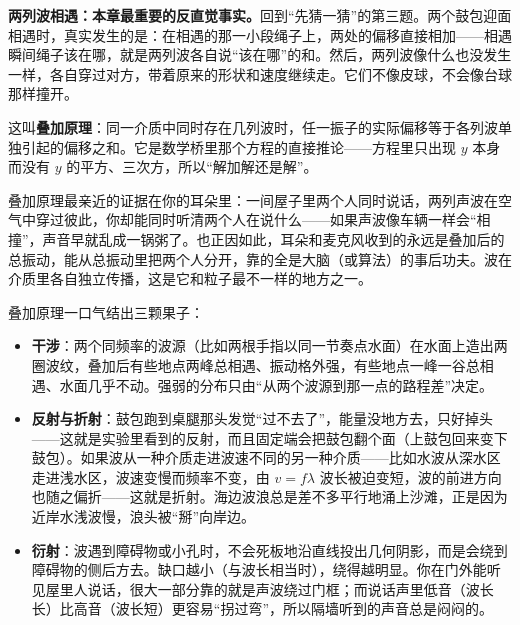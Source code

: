 \begin{mainline}
\textbf{两列波相遇：本章最重要的反直觉事实。}回到“先猜一猜”的第三题。两个鼓包迎面相遇时，真实发生的是：在相遇的那一小段绳子上，两处的偏移直接相加——相遇瞬间绳子该在哪，就是两列波各自说“该在哪”的和。然后，两列波像什么也没发生一样，各自穿过对方，带着原来的形状和速度继续走。它们不像皮球，不会像台球那样撞开。

这叫\textbf{叠加原理}：同一介质中同时存在几列波时，任一振子的实际偏移等于各列波单独引起的偏移之和。它是数学桥里那个方程的直接推论——方程里只出现 \(y\) 本身而没有 \(y\) 的平方、三次方，所以“解加解还是解”。

叠加原理最亲近的证据在你的耳朵里：一间屋子里两个人同时说话，两列声波在空气中穿过彼此，你却能同时听清两个人在说什么——如果声波像车辆一样会“相撞”，声音早就乱成一锅粥了。也正因如此，耳朵和麦克风收到的永远是叠加后的总振动，能从总振动里把两个人分开，靠的全是大脑（或算法）的事后功夫。波在介质里各自独立传播，这是它和粒子最不一样的地方之一。

叠加原理一口气结出三颗果子：

\begin{itemize}
  \item \textbf{干涉}：两个同频率的波源（比如两根手指以同一节奏点水面）在水面上造出两圈波纹，叠加后有些地点两峰总相遇、振动格外强，有些地点一峰一谷总相遇、水面几乎不动。强弱的分布只由“从两个波源到那一点的路程差”决定。
  \item \textbf{反射与折射}：鼓包跑到桌腿那头发觉“过不去了”，能量没地方去，只好掉头——这就是实验里看到的反射，而且固定端会把鼓包翻个面（上鼓包回来变下鼓包）。如果波从一种介质走进波速不同的另一种介质——比如水波从深水区走进浅水区，波速变慢而频率不变，由 \(v=f\lambda\) 波长被迫变短，波的前进方向也随之偏折——这就是折射。海边波浪总是差不多平行地涌上沙滩，正是因为近岸水浅波慢，浪头被“掰”向岸边。
  \item \textbf{衍射}：波遇到障碍物或小孔时，不会死板地沿直线投出几何阴影，而是会绕到障碍物的侧后方去。缺口越小（与波长相当时），绕得越明显。你在门外能听见屋里人说话，很大一部分靠的就是声波绕过门框；而说话声里低音（波长长）比高音（波长短）更容易“拐过弯”，所以隔墙听到的声音总是闷闷的。
\end{itemize}
\end{mainline}

